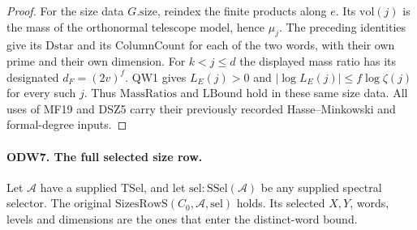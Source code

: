 \begin{proof}
For the size data $G.\mathrm{size}$, reindex the finite products
along $e$. Its $\mathrm{vol}(j)$ is the mass of the orthonormal
telescope model, hence $\mu_j$. The preceding identities give its
$\mathrm{Dstar}$ and its $\mathrm{ColumnCount}$ for each of the
two words, with their own prime and their own dimension.
For $k<j\le d$ the displayed mass ratio has its designated
$d_F=(2v)^f$. QW1 gives $L_E(j)>0$ and
$|\log L_E(j)|\le f\log\zeta(j)$ for every such $j$.
Thus $\mathrm{MassRatios}$ and $\mathrm{LBound}$ hold in these
same size data. All uses of MF19 and DSZ5 carry their previously
recorded Hasse--Minkowski and formal-degree inputs.
\end{proof}

\paragraph{ODW7. The full selected size row.}
\label{claim:ODW7}
Let $\mathcal A$ have a supplied $\mathrm{TSel}$, and let
$\mathrm{sel}:\mathrm{SSel}(\mathcal A)$ be any supplied spectral
selector. The original $\mathrm{SizesRowS}(C_0,\mathcal A,\mathrm{sel})$
holds. Its selected $X,Y$, words, levels and dimensions are the ones
that enter the distinct-word bound.
